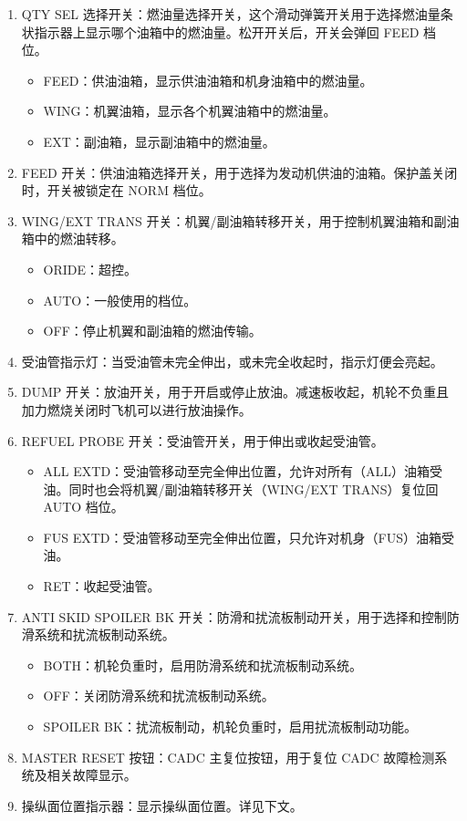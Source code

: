 \begin{enumerate}
  \item QTY SEL 选择开关：燃油量选择开关，这个滑动弹簧开关用于选择燃油量条状指示器上显示哪个油箱中的燃油量。松开开关后，开关会弹回 FEED 档位。
  \begin{itemize}
    \item FEED：供油油箱，显示供油油箱和机身油箱中的燃油量。
    \item WING：机翼油箱，显示各个机翼油箱中的燃油量。
    \item EXT：副油箱，显示副油箱中的燃油量。
  \end{itemize}
  \item FEED 开关：供油油箱选择开关，用于选择为发动机供油的油箱。保护盖关闭时，开关被锁定在 NORM 档位。
  \item WING/EXT TRANS 开关：机翼/副油箱转移开关，用于控制机翼油箱和副油箱中的燃油转移。
  \begin{itemize}
    \item ORIDE：超控。
    \item AUTO：一般使用的档位。
    \item OFF：停止机翼和副油箱的燃油传输。
  \end{itemize}
  \item 受油管指示灯：当受油管未完全伸出，或未完全收起时，指示灯便会亮起。
  \item DUMP 开关：放油开关，用于开启或停止放油。减速板收起，机轮不负重且加力燃烧关闭时飞机可以进行放油操作。
  \item REFUEL PROBE 开关：受油管开关，用于伸出或收起受油管。
  \begin{itemize}
    \item ALL EXTD：受油管移动至完全伸出位置，允许对所有（ALL）油箱受油。同时也会将机翼/副油箱转移开关（WING/EXT TRANS）复位回 AUTO 档位。
    \item FUS EXTD：受油管移动至完全伸出位置，只允许对机身（FUS）油箱受油。
    \item RET：收起受油管。
  \end{itemize}
  \item ANTI SKID SPOILER BK 开关：防滑和扰流板制动开关，用于选择和控制防滑系统和扰流板制动系统。
  \begin{itemize}
    \item BOTH：机轮负重时，启用防滑系统和扰流板制动系统。
    \item OFF：关闭防滑系统和扰流板制动系统。
    \item SPOILER BK：扰流板制动，机轮负重时，启用扰流板制动功能。
  \end{itemize}
  \item MASTER RESET 按钮：CADC 主复位按钮，用于复位 CADC 故障检测系统及相关故障显示。
  \item 操纵面位置指示器：显示操纵面位置。详见下文。
\end{enumerate}

